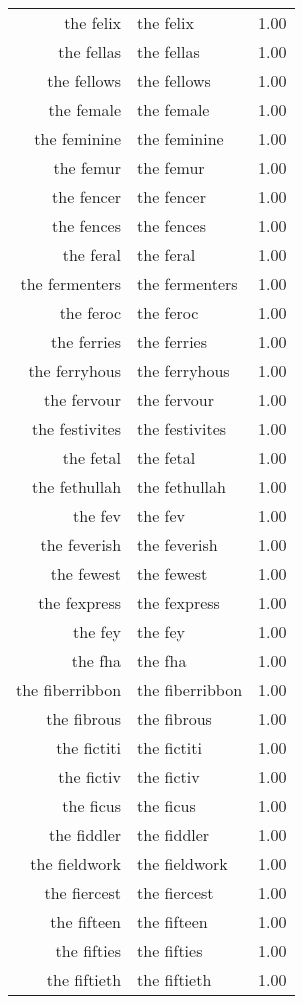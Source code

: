 \begin{table}[ht]
\begin{tabular}{rlr}
  the felix & the felix & 1.00 \\ 
  the fellas & the fellas & 1.00 \\ 
  the fellows & the fellows & 1.00 \\ 
  the female & the female & 1.00 \\ 
  the feminine & the feminine & 1.00 \\ 
  the femur & the femur & 1.00 \\ 
  the fencer & the fencer & 1.00 \\ 
  the fences & the fences & 1.00 \\ 
  the feral & the feral & 1.00 \\ 
  the fermenters & the fermenters & 1.00 \\ 
  the feroc & the feroc & 1.00 \\ 
  the ferries & the ferries & 1.00 \\ 
  the ferryhous & the ferryhous & 1.00 \\ 
  the fervour & the fervour & 1.00 \\ 
  the festivites & the festivites & 1.00 \\ 
  the fetal & the fetal & 1.00 \\ 
  the fethullah & the fethullah & 1.00 \\ 
  the fev & the fev & 1.00 \\ 
  the feverish & the feverish & 1.00 \\ 
  the fewest & the fewest & 1.00 \\ 
  the fexpress & the fexpress & 1.00 \\ 
  the fey & the fey & 1.00 \\ 
  the fha & the fha & 1.00 \\ 
  the fiberribbon & the fiberribbon & 1.00 \\ 
  the fibrous & the fibrous & 1.00 \\ 
  the fictiti & the fictiti & 1.00 \\ 
  the fictiv & the fictiv & 1.00 \\ 
  the ficus & the ficus & 1.00 \\ 
  the fiddler & the fiddler & 1.00 \\ 
  the fieldwork & the fieldwork & 1.00 \\ 
  the fiercest & the fiercest & 1.00 \\ 
  the fifteen & the fifteen & 1.00 \\ 
  the fifties & the fifties & 1.00 \\ 
  the fiftieth & the fiftieth & 1.00 \\ 

\end{tabular}
\end{table}
